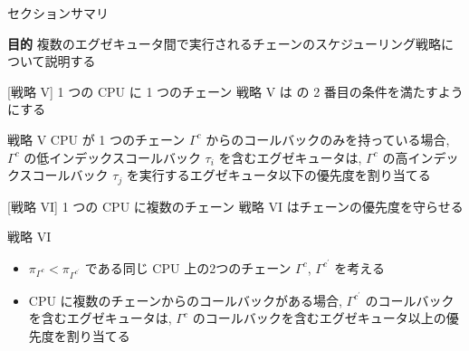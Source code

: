 \begin{frame}{セクションサマリ}
    \begin{itembox}[l]{\textbf{目的}}
        複数のエグゼキュータ間で実行されるチェーンのスケジューリング戦略について説明する
    \end{itembox}
\end{frame}


\begin{frame}{[戦略 V] 1 つの CPU に 1 つのチェーン}
    戦略 V は  の 2 番目の条件を満たすようにする
    \begin{block}{戦略 V}
        CPU が 1 つのチェーン $\Gamma^{c}$ からのコールバックのみを持っている場合, $\Gamma^{c}$ の低インデックスコールバック $\tau_{i}$ を含むエグゼキュータは, $\Gamma^{c}$ の高インデックスコールバック $\tau_{j}$ を実行するエグゼキュータ以下の優先度を割り当てる
    \end{block}
\end{frame}

\begin{frame}{[戦略 VI]  1 つの CPU に複数のチェーン}
    戦略 VI はチェーンの優先度を守らせる
    \begin{block}{戦略 VI}
        \setlength{\linewidth}{0.98\columnwidth}
        \begin{itemize}
            \item $\pi_{\Gamma^{c}}<\pi_{\Gamma^{c^{\prime}}}$ である同じ CPU 上の2つのチェーン $\Gamma^{c}$, $\Gamma^{c^{\prime}}$ を考える
            \item CPU に複数のチェーンからのコールバックがある場合, $\Gamma^{c^{\prime}}$ のコールバックを含むエグゼキュータは, $\Gamma^{c}$ のコールバックを含むエグゼキュータ以上の優先度を割り当てる
        \end{itemize}
    \end{block}
\end{frame}


